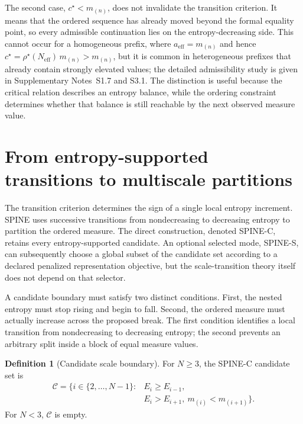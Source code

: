 \documentclass[aip,cha,reprint,superscriptaddress,floatfix]{revtex4-2}
\theoremstyle{definition}
\newtheorem{definition}[theorem]{Definition}
\theoremstyle{remark}
\newcommand{\Neff}{N_{\mathrm{eff}}}
\newcommand{\aeff}{a_{\mathrm{eff}}}
\newcommand{\rhostar}{\rho^{\star}}
\newcommand{\cstar}{c^{\star}}
\newcommand{\cC}{\mathcal C}
\begin{document}
The second case, \(\cstar<m_{(n)}\), does not invalidate the transition criterion. It means that the ordered sequence has already moved beyond the formal equality point, so every admissible continuation lies on the entropy-decreasing side. 
This cannot occur for a homogeneous prefix, where \(\aeff=m_{(n)}\) and hence \(\cstar=\rhostar(\Neff)\,m_{(n)}>m_{(n)}\), but it
is common in heterogeneous prefixes that already contain strongly elevated values; the detailed admissibility study is given in Supplementary Notes~S1.7 and S3.1. 
The distinction is useful because the critical relation describes an entropy balance, while the ordering constraint determines whether
that balance is still reachable by the next observed measure value.

\section{From entropy-supported transitions to multiscale partitions}
\label{sec:partition}

The transition criterion determines the sign of a single local entropy increment. SPINE uses successive transitions from nondecreasing to decreasing entropy to partition the ordered measure. The direct construction, denoted SPINE-C, retains every entropy-supported candidate. An optional selected mode, SPINE-S, can subsequently choose a global subset of the candidate set according to a declared penalized representation objective, but the scale-transition theory itself does not depend on that selector.

A candidate boundary must satisfy two distinct conditions. First, the nested entropy must stop rising and begin to fall. Second, the ordered measure must actually increase across the proposed break. The first condition identifies a local transition from nondecreasing to decreasing entropy; the second prevents an arbitrary split inside a block of equal measure values.

\begin{definition}[Candidate scale boundary]
\label{def:candidate}
For \(N\ge3\), the SPINE-C candidate set is
\begin{equation}
\begin{split}
\cC=\{i\in\{2,\ldots,N-1\}:{}&E_i\ge E_{i-1},\\
&E_i>E_{i+1},\ m_{(i)}<m_{(i+1)}\}.
\end{split}
\label{eq:candidate}
\end{equation}
For \(N<3\), \(\cC\) is empty.
\end{definition}
\end{document}
